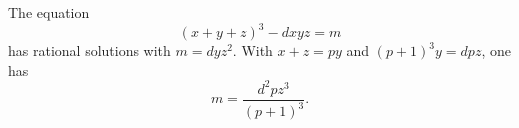 \begin{proposition}
    The equation
\[
    (x+y+z)^3-dxyz=m
\]
    has rational solutions with $m=dyz^2$. With $x+z=py$ and $(p+1)^3y=dpz$, one has
\[
    m=\frac{d^2pz^3}{(p+1)^3}.
\]
\end{proposition}
